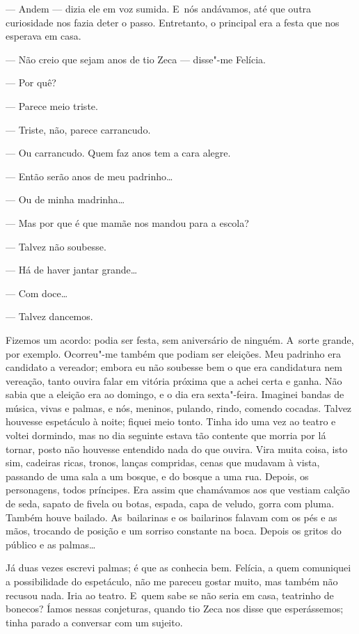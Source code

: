 \begin{linenumbers}
--- Andem --- dizia ele em voz sumida. E~nós andávamos, até que outra
curiosidade nos fazia deter o passo. Entretanto, o principal era a festa
que nos esperava em casa.

--- Não creio que sejam anos de tio Zeca --- disse"-me Felícia.

--- Por quê?

--- Parece meio triste.

--- Triste, não, parece carrancudo.

--- Ou carrancudo. Quem faz anos tem a cara alegre.

--- Então serão anos de meu padrinho\ldots{}

--- Ou de minha madrinha\ldots{}

--- Mas por que é que mamãe nos mandou para a escola?

--- Talvez não soubesse.

--- Há de haver jantar grande\ldots{}

--- Com doce\ldots{}

--- Talvez dancemos.

Fizemos um acordo: podia ser festa, sem aniversário de ninguém. A~sorte
grande, por exemplo. Ocorreu"-me também que podiam ser eleições. Meu
padrinho era candidato a vereador; embora eu não soubesse bem o que era
candidatura nem vereação, tanto ouvira falar em vitória próxima que a
achei certa e ganha. Não sabia que a eleição era ao domingo, e o dia era
sexta"-feira. Imaginei bandas de música, vivas e palmas, e nós, meninos,
pulando, rindo, comendo cocadas. Talvez houvesse espetáculo à noite;
fiquei meio tonto. Tinha ido uma vez ao teatro e voltei dormindo, mas no
dia seguinte estava tão contente que morria por lá tornar, posto não
houvesse entendido nada do que ouvira. Vira muita coisa, isto sim,
cadeiras ricas, tronos, lanças compridas, cenas que mudavam à vista,
passando de uma sala a um bosque, e do bosque a uma rua. Depois, os
personagens, todos príncipes. Era assim que chamávamos aos que vestiam
calção de seda, sapato de fivela ou botas, espada, capa de veludo, gorra
com pluma. Também houve bailado. As~bailarinas e os bailarinos falavam
com os pés e as mãos, trocando de posição e um sorriso constante na
boca. Depois os gritos do público e as palmas\ldots{}

Já duas vezes escrevi palmas; é que as conhecia bem. Felícia, a quem
comuniquei a possibilidade do espetáculo, não me pareceu gostar muito,
mas também não recusou nada. Iria ao teatro. E~quem sabe se não seria em
casa, teatrinho de bonecos? Íamos nessas conjeturas, quando tio Zeca nos
disse que esperássemos; tinha parado a conversar com um sujeito.


\end{linenumbers}
